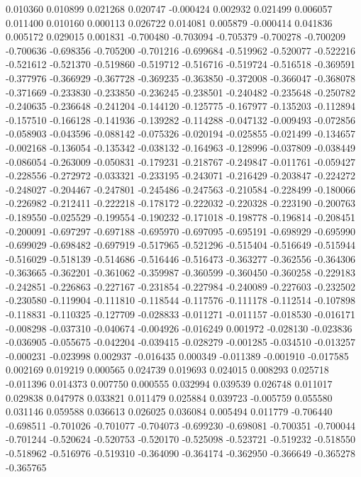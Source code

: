 0.010360
0.010899
0.021268
0.020747
-0.000424
0.002932
0.021499
0.006057
0.011400
0.010160
0.000113
0.026722
0.014081
0.005879
-0.000414
0.041836
0.005172
0.029015
0.001831
-0.700480
-0.703094
-0.705379
-0.700278
-0.700209
-0.700636
-0.698356
-0.705200
-0.701216
-0.699684
-0.519962
-0.520077
-0.522216
-0.521612
-0.521370
-0.519860
-0.519712
-0.516716
-0.519724
-0.516518
-0.369591
-0.377976
-0.366929
-0.367728
-0.369235
-0.363850
-0.372008
-0.366047
-0.368078
-0.371669
-0.233830
-0.233850
-0.236245
-0.238501
-0.240482
-0.235648
-0.250782
-0.240635
-0.236648
-0.241204
-0.144120
-0.125775
-0.167977
-0.135203
-0.112894
-0.157510
-0.166128
-0.141936
-0.139282
-0.114288
-0.047132
-0.009493
-0.072856
-0.058903
-0.043596
-0.088142
-0.075326
-0.020194
-0.025855
-0.021499
-0.134657
-0.002168
-0.136054
-0.135342
-0.038132
-0.164963
-0.128996
-0.037809
-0.038449
-0.086054
-0.263009
-0.050831
-0.179231
-0.218767
-0.249847
-0.011761
-0.059427
-0.228556
-0.272972
-0.033321
-0.233195
-0.243071
-0.216429
-0.203847
-0.224272
-0.248027
-0.204467
-0.247801
-0.245486
-0.247563
-0.210584
-0.228499
-0.180066
-0.226982
-0.212411
-0.222218
-0.178172
-0.222032
-0.220328
-0.223190
-0.200763
-0.189550
-0.025529
-0.199554
-0.190232
-0.171018
-0.198778
-0.196814
-0.208451
-0.200091
-0.697297
-0.697188
-0.695970
-0.697095
-0.695191
-0.698929
-0.695990
-0.699029
-0.698482
-0.697919
-0.517965
-0.521296
-0.515404
-0.516649
-0.515944
-0.516029
-0.518139
-0.514686
-0.516446
-0.516473
-0.363277
-0.362556
-0.364306
-0.363665
-0.362201
-0.361062
-0.359987
-0.360599
-0.360450
-0.360258
-0.229183
-0.242851
-0.226863
-0.227167
-0.231854
-0.227984
-0.240089
-0.227603
-0.232502
-0.230580
-0.119904
-0.111810
-0.118544
-0.117576
-0.111178
-0.112514
-0.107898
-0.118831
-0.110325
-0.127709
-0.028833
-0.011271
-0.011157
-0.018530
-0.016171
-0.008298
-0.037310
-0.040674
-0.004926
-0.016249
0.001972
-0.028130
-0.023836
-0.036905
-0.055675
-0.042204
-0.039415
-0.028279
-0.001285
-0.034510
-0.013257
-0.000231
-0.023998
0.002937
-0.016435
0.000349
-0.011389
-0.001910
-0.017585
0.002169
0.019219
0.000565
0.024739
0.019693
0.024015
0.008293
0.025718
-0.011396
0.014373
0.007750
0.000555
0.032994
0.039539
0.026748
0.011017
0.029838
0.047978
0.033821
0.011479
0.025884
0.039723
-0.005759
0.055580
0.031146
0.059588
0.036613
0.026025
0.036084
0.005494
0.011779
-0.706440
-0.698511
-0.701026
-0.701077
-0.704073
-0.699230
-0.698081
-0.700351
-0.700044
-0.701244
-0.520624
-0.520753
-0.520170
-0.525098
-0.523721
-0.519232
-0.518550
-0.518962
-0.516976
-0.519310
-0.364090
-0.364174
-0.362950
-0.366649
-0.365278
-0.365765

